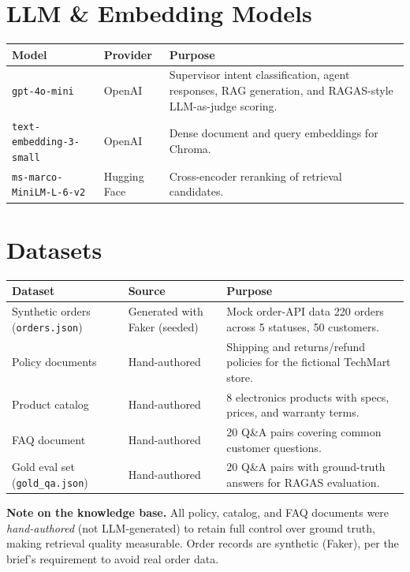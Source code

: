 \documentclass[10pt,a4paper]{article}
\newcommand{\code}[1]{\texttt{#1}}
\begin{document}
\section{LLM \& Embedding Models}
\small
\begin{tabularx}{\textwidth}{@{}>{\raggedright\arraybackslash}p{4.0cm}>{\raggedright\arraybackslash}p{2.4cm}Y@{}}
\toprule
\textbf{Model} & \textbf{Provider} & \textbf{Purpose} \\
\midrule
\code{gpt-4o-mini}             & OpenAI       & Supervisor intent classification, agent responses, RAG generation, and RAGAS-style LLM-as-judge scoring. \\
\code{text-embedding-3-small}  & OpenAI       & Dense document and query embeddings for Chroma. \\
\code{ms-marco-MiniLM-L-6-v2}  & Hugging Face & Cross-encoder reranking of retrieval candidates. \\
\bottomrule
\end{tabularx}
\normalsize

\section{Datasets}
\small
\begin{tabularx}{\textwidth}{@{}>{\raggedright\arraybackslash}p{3.4cm}>{\raggedright\arraybackslash}p{3.0cm}Y@{}}
\toprule
\textbf{Dataset} & \textbf{Source} & \textbf{Purpose} \\
\midrule
Synthetic orders (\code{orders.json}) & Generated with Faker (seeded) & Mock order-API data \textemdash{} 220 orders across 5 statuses, 50 customers. \\
Policy documents & Hand-authored & Shipping and returns/refund policies for the fictional TechMart store. \\
Product catalog & Hand-authored & 8 electronics products with specs, prices, and warranty terms. \\
FAQ document & Hand-authored & 20 Q\&A pairs covering common customer questions. \\
Gold eval set (\code{gold\_qa.json}) & Hand-authored & 20 Q\&A pairs with ground-truth answers for RAGAS evaluation. \\
\bottomrule
\end{tabularx}
\normalsize

\textbf{Note on the knowledge base.} All policy, catalog, and FAQ documents were \emph{hand-authored}
(not LLM-generated) to retain full control over ground truth, making retrieval quality measurable.
Order records are synthetic (Faker), per the brief's requirement to avoid real order data.
\end{document}
